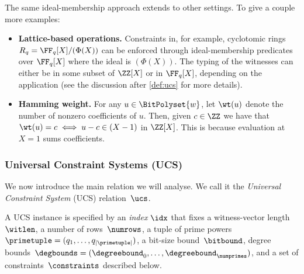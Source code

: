 The same ideal-membership approach extends to other settings. To give a couple more examples:%
\begin{itemize}[leftmargin=*]
  \item \textbf{Lattice-based operations.} Constraints in, for example, cyclotomic rings $R_q = \FF_q[X]/(\Phi(X))$ can be enforced through ideal-membership predicates over $\FF_q[X]$ where the ideal is $(\Phi(X))$. The typing of the witnesses can either be in some subset of  $\ZZ[X]$ or in $\FF_q[X]$,  depending on the application (see the discussion after \cref{def:ucs} for more details).
  \item \textbf{Hamming weight.} For any $u\in\BitPolyset{w}$, let $\wt(u)$ denote the number of nonzero coefficients of $u$. Then, given $c\in \ZZ$ we have that $\wt(u) = c \;\Longleftrightarrow\; u - c \in (X-1)$ in $\ZZ[X]$. This is because evaluation at $X=1$ sums coefficients.%
\end{itemize}


\subsubsection{Universal Constraint Systems (UCS)}

We now introduce the main relation we will analyse. We call it the \emph{Universal Constraint System} (UCS) relation~$\ucs$. 



A UCS instance is specified by an \emph{index} $\idx$ that fixes
a witness-vector length~$\witlen$,
a number of rows~$\numrows$,
a tuple of prime powers $\primetuple=(q_1,\ldots,q_{|\primetuple|})$,
a bit-size bound~$\bitbound$,
degree bounds~$\degbounds=(\degreebound_0,\ldots,\degreebound_{\numprimes})$,
and a set of constraints~$\constraints$ described below.

